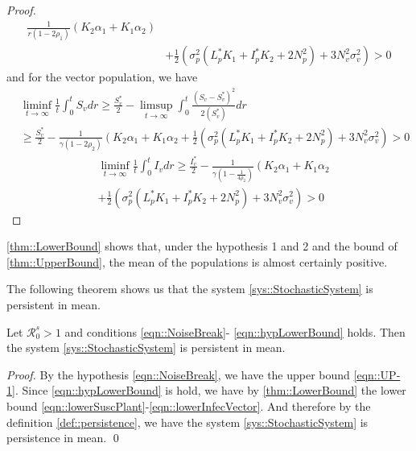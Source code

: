 \begin{proof}
\begin{align*}
	 	\frac{1}{ r (1 - 2 \rho_1)}
	 	\left(
	 		K_2 \alpha_1 + 
	 		K_1 \alpha_2 
	 	\right)
	 	\\
 		&+
 		\frac{1}{2}
 		\left(
 			\sigma_p ^ 2
 			(
 				L_p ^* K_1 + 
 				I_p ^* K_2 + 
 				2 N_p ^ 2
 			) + 
 			3 N_v ^ 2
 			\sigma_v ^ 2
 		\right)>0
	\end{align*}
	and for the vector population, we have
	\begin{align*}
	 	&
	 	\liminf
	 	\limits_{t \to \infty}
	 	\frac{1}{t}
	 	\int_{0} ^ {t} 
	 		S_v 
	 	dr
	 	\geq
	 	\frac{S_v^*}{2}
	 	-
	 	\limsup_{t\to \infty}
	 	\int_{0} ^ {t}
	 	\frac{(S_v - S_v^*) ^ 2}{2 (S_v ^* )}dr
	 	\\
	 	&\geq
	 	\frac{S_v ^* }{2} - 
	 	\frac{1}{\gamma(1-2\rho_2)}
	 	\left(
	 		K_2 \alpha_1 + 
	 		K_1 \alpha_2
	 	\right.+
 		\frac{1}{2}
 		\left(
 			\sigma_p^2
 			(
 				L_p ^* K_1 + 
 				I_p ^* K_2 + 
 				2N_p ^2
 			) + 
 			3N_v ^ 2
 			\sigma_v ^ 2
 		\right) >0
	\end{align*}
%
 \begin{align*}
	 	&
	 	\liminf\limits_{t \to \infty}
	 	\frac{1}{t}\int_{0}^{t} I_v dr
	 	\geq
 		\frac{I_v^*}{2} - 
 		\frac{1}{
 			\gamma
 			(
 				1 - 
 				\frac{1}{4\rho_2}
 			)}
 		\left(
 			K_2 \alpha_1 + 
 			K_1 \alpha_2
 		\right.\\
	 	&+
	 	\frac{1}{2}
	 	\left(
	 		\sigma_p ^ 2
	 		(
	 			L_p ^* K_1 + 
	 			I_p ^ *K_2 + 
	 			2N_p ^ 2
	 		) + 
	 		3N_v ^ 2
	 		\sigma_v ^ 2
	 	\right)
	 	>0
 \end{align*}
\end{proof}
%
\begin{remark}
	\autoref{thm::LowerBound} shows that, under the hypothesis 1 and 2
	and the bound of \autoref{thm::UpperBound}, the mean of the 
	populations is almost certainly positive. 
\end{remark}
The following theorem shows us that the system \autoref{sys::StochasticSystem} is persistent in mean.
\begin{theorem}
	Let $\mathcal{R}^s_0>1$ and conditions \autoref{eqn::NoiseBreak}-
	\autoref{eqn::hypLowerBound} holds. 
	Then the system \autoref{sys::StochasticSystem} is persistent in mean.
\end{theorem}
\begin{proof}
	By the hypothesis \autoref{eqn::NoiseBreak}, we have the upper bound
	\autoref{eqn::UP-1}. Since \autoref{eqn::hypLowerBound} is hold, we have by
	\autoref{thm::LowerBound} the lower bound
	\autoref{eqn::lowerSuscPlant}-\autoref{eqn::lowerInfecVector}. 
	And therefore by the definition \autoref{def::persistence},
	we have the system \autoref{sys::StochasticSystem} is persistence in mean.
	\qed
\end{proof}
